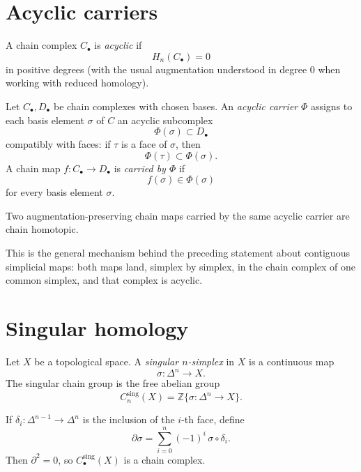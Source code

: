 \section{Acyclic carriers}
\label{section-acyclic-carriers}

\begin{definition}
\label{definition-acyclic-chain-complex}
A chain complex $C_\bullet$ is {\it acyclic} if
\[
H_n(C_\bullet)=0
\]
in positive degrees (with the usual augmentation
understood in degree $0$ when working with reduced
homology).
\end{definition}

\begin{definition}
\label{definition-acyclic-carrier}
Let $C_\bullet,D_\bullet$ be chain complexes with
chosen bases. An {\it acyclic carrier} $\Phi$
assigns to each basis element $\sigma$ of $C$ an
acyclic subcomplex
\[
\Phi(\sigma)\subset D_\bullet
\]
compatibly with faces: if $\tau$ is a face of
$\sigma$, then
\[
\Phi(\tau)\subset \Phi(\sigma).
\]
A chain map $f:C_\bullet\to D_\bullet$ is
{\it carried by $\Phi$} if
\[
f(\sigma)\in \Phi(\sigma)
\]
for every basis element $\sigma$.
\end{definition}

\begin{theorem}
\label{theorem-acyclic-carrier}
Two augmentation-preserving chain maps carried by
the same acyclic carrier are chain homotopic.
\end{theorem}

\noindent
This is the general mechanism behind the preceding
statement about contiguous simplicial maps: both
maps land, simplex by simplex, in the chain complex
of one common simplex, and that complex is acyclic.

\section{Singular homology}
\label{section-singular-homology}

\begin{definition}
\label{definition-singular-simplex}
Let $X$ be a topological space. A {\it singular
$n$-simplex} in $X$ is a continuous map
\[
\sigma:\Delta^n\longrightarrow X.
\]
The singular chain group is the free abelian group
\[
C_n^{\operatorname{sing}}(X)
=
\mathbb Z\{\sigma:\Delta^n\to X\}.
\]
\end{definition}

\noindent
If $\delta_i:\Delta^{n-1}\to\Delta^n$ is the
inclusion of the $i$-th face, define
\[
\partial\sigma
=
\sum_{i=0}^n(-1)^i\,\sigma\circ\delta_i.
\]
Then $\partial^2=0$, so
$C_\bullet^{\operatorname{sing}}(X)$ is a chain
complex.

